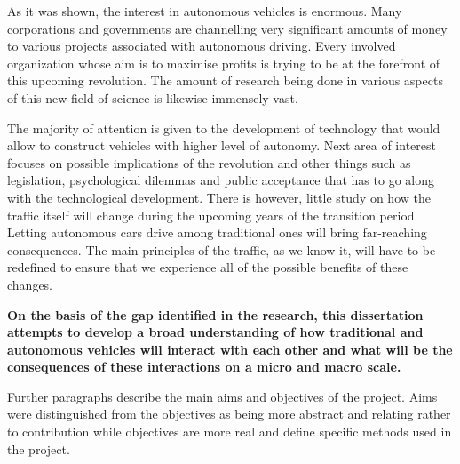 \documentclass[11pt,english]{article}
\begin{document}
\par



As it was shown, the interest in autonomous vehicles is enormous. Many corporations and governments are channelling very significant amounts of money to various projects associated with autonomous driving. Every involved organization whose aim is to maximise profits is trying to be at the forefront of this upcoming revolution. The amount of research being done in various aspects of this new field of science is likewise immensely vast. 
\par
The majority of attention is given to the development of technology that would allow to construct vehicles with higher level of autonomy. Next area of interest focuses on possible implications of the revolution and other things such as legislation, psychological dilemmas and public acceptance that has to go along with the technological development. There is however, little study on how the traffic itself will change during the upcoming years of the transition period. Letting autonomous cars drive among traditional ones will bring far-reaching consequences. The main principles of the traffic, as we know it, will have to be redefined to ensure that we experience all of the possible benefits of these changes. 
\par
\textbf{On the basis of the gap identified in the research, this dissertation attempts to develop a broad understanding of how traditional and autonomous vehicles will interact with each other and what will be the consequences of these interactions on a micro and macro scale.}





\par 
Further paragraphs describe the main aims and objectives of the project. Aims were distinguished from the objectives as being more abstract and relating rather to contribution while objectives are more real and define specific methods used in the project.



\end{document}
